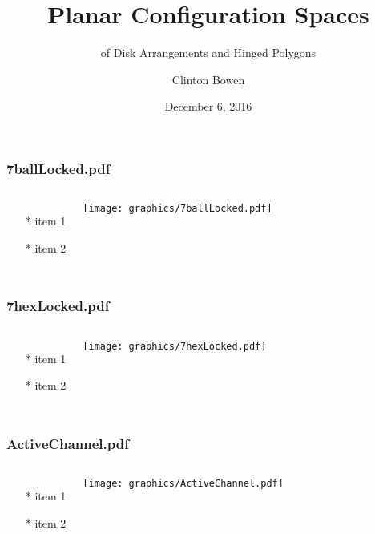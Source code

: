 \documentclass{beamer}
\title[Planar Configuration Spaces]{Planar Configuration Spaces }
\subtitle{of Disk Arrangements and Hinged Polygons}
\author{Clinton Bowen}
\institute
{
  Cal State Northridge
}
\date
{December 6, 2016}
\begin{document}
\frame{\titlepage}

\begin{frame} \frametitle{7ballLocked.pdf}
    \begin{columns}[c]
        \begin{itemize}
            \item[*] item 1
            \item[*] item 2
        \end{itemize}
        \begin{minipage}{\linewidth}
            \begin{center}
            \texttt{[image: graphics/7ballLocked.pdf]}
            \label{gfx:7ballLocked.pdf}
            \end{center}
        \end{minipage}
    \end{columns}
\end{frame}
\begin{frame} \frametitle{7hexLocked.pdf}
    \begin{columns}[c]
        \begin{itemize}
            \item[*] item 1
            \item[*] item 2
        \end{itemize}
        \begin{minipage}{\linewidth}
            \begin{center}
            \texttt{[image: graphics/7hexLocked.pdf]}
            \label{gfx:7hexLocked.pdf}
            \end{center}
        \end{minipage}
    \end{columns}
\end{frame}
\begin{frame} \frametitle{ActiveChannel.pdf}
    \begin{columns}[c]
        \begin{itemize}
            \item[*] item 1
            \item[*] item 2
        \end{itemize}
        \begin{minipage}{\linewidth}
            \begin{center}
            \texttt{[image: graphics/ActiveChannel.pdf]}
            \label{gfx:ActiveChannel.pdf}
            \end{center}
        \end{minipage}
    \end{columns}
\end{frame}
\end{document}
